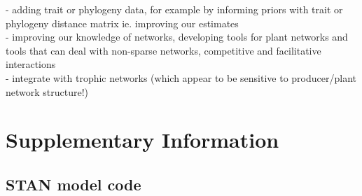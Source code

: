\documentclass[a4,12pt]{article}
\begin{document}
    
    - adding trait or phylogeny data, for example by informing priors with trait or phylogeny distance matrix
    ie. improving our estimates \\
    - improving our knowledge of networks, developing tools for plant networks and tools that can deal with non-sparse networks, competitive and facilitative interactions \\
    - integrate with trophic networks (which appear to be sensitive to producer/plant network structure!)\\




    

\section{Supplementary Information}

    \subsection{STAN model code}

     
\end{document}
